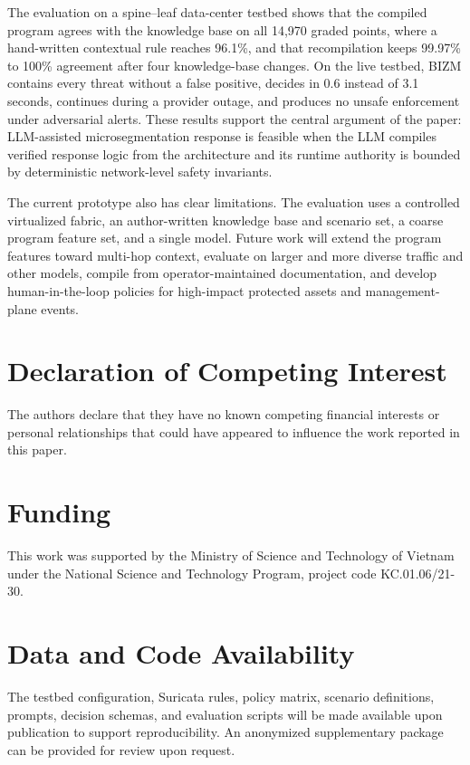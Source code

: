 \documentclass[final,5p]{elsarticle}
\begin{document}
The evaluation on a spine--leaf data-center testbed shows that the compiled program agrees with the knowledge base on all 14,970 graded points, where a hand-written contextual rule reaches 96.1\%, and that recompilation keeps 99.97\% to 100\% agreement after four knowledge-base changes. On the live testbed, BIZM contains every threat without a false positive, decides in 0.6 instead of 3.1 seconds, continues during a provider outage, and produces no unsafe enforcement under adversarial alerts. These results support the central argument of the paper: LLM-assisted microsegmentation response is feasible when the LLM compiles verified response logic from the architecture and its runtime authority is bounded by deterministic network-level safety invariants.

The current prototype also has clear limitations. The evaluation uses a controlled virtualized fabric, an author-written knowledge base and scenario set, a coarse program feature set, and a single model. Future work will extend the program features toward multi-hop context, evaluate on larger and more diverse traffic and other models, compile from operator-maintained documentation, and develop human-in-the-loop policies for high-impact protected assets and management-plane events.

\section*{Declaration of Competing Interest}
\noindent The authors declare that they have no known competing financial interests or personal relationships that could have appeared to influence the work reported in this paper.


\section*{Funding}
This work was supported by the Ministry of Science and Technology of Vietnam under the National Science and Technology Program, project code KC.01.06/21-30.

\section*{Data and Code Availability}
The testbed configuration, Suricata rules, policy matrix, scenario definitions, prompts, decision schemas, and evaluation scripts will be made available upon publication to support reproducibility. An anonymized supplementary package can be provided for review upon request.
\end{document}
